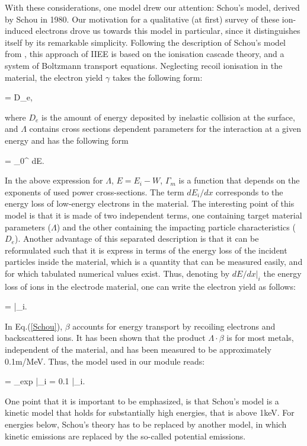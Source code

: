 \noindent With these considerations, one model drew our attention: Schou's model, derived by Schou in 1980. Our motivation for a qualitative (at first) survey of these ion-induced electrons drove us towards this model in particular, since it distinguishes itself by its remarkable simplicity. Following the description of Schou's model from \cite{HasselII}, this approach of IIEE is based on the ionisation cascade theory, and a system of Boltzmann transport equations.  Neglecting recoil ionisation in the material, the electron yield $\gamma$ takes the following form: 

\beq
\gamma = \Lambda \cdot D_e,
\eeq

\noindent where $D_e$ is the amount of energy deposited by inelastic collision at the surface, and $\Lambda$ contains cross sections dependent parameters for the interaction at a given energy and has the following form 

\beq
\Lambda = \int_0^{\infty} dE.
\eeq

\noindent In the above expression for $\Lambda$, $E=E_i-W$, $\Gamma_m$ is a function that depends on the exponents of used power cross-sections. The term $dE_i/dx$ corresponds to the energy loss of low-energy electrons in the material. The interesting point of this model is that it is made of two independent terms, one containing target material parameters ($\Lambda$) and the other containing the impacting particle characteristics ($D_e$). Another advantage of this separated description is that it can be reformulated such that it is express in terms of the energy loss of the incident particles inside the material, which is a quantity that can be measured easily, and for which tabulated numerical values exist. Thus, denoting by $dE/dx\Big|_i$ the energy loss of ions in the electrode material, one can write the electron yield as follows: 

\beq
\gamma = \Lambda \cdot \beta \cdot  {}\Bigg|_i.\label{Schou}
\eeq

\noindent In Eq.(\ref{Schou}), $\beta$ accounts for energy transport by recoiling electrons and backscattered ions. It has been shown that the product $\Lambda\cdot\beta$ is for most metals, independent of the material, and has been measured to be approximately 0.1m/MeV. Thus, the model used in our module reads:

\beq
\gamma = \Lambda_{exp} \cdot  {}\Bigg|_i = 0.1 \cdot  {}\Bigg|_i.
\eeq

\noindent One point that it is important to be emphasized, is that Schou's model is a kinetic model that holds for substantially high energies, that is above 1keV. For energies below, Schou's theory has to be replaced by another model, in which kinetic emissions are replaced by the so-called potential emissions.\\

